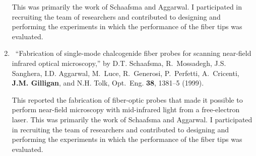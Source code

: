 \begin{enumerate}
\begin{credit}
	  This was primarily the work of Schaafsma and Aggarwal. I participated in recruiting the team of researchers and contributed to designing and performing the experiments in which the performance of the fiber tips was evaluated.
	  \end{credit}
%	
	\item
	\textdagger\ 
	\enquote{Fabrication of single-mode chalcogenide fiber probes for scanning
	  near-field infrared optical microscopy,}  by D.T. Schaafsma, R.~Mossadegh,
	  J.S. Sanghera, I.D. Aggarwal, M.~Luce, R.~Generosi, P.~Perfetti,
	  A.~Cricenti, \textbf{J.M. Gilligan}, and N.H. Tolk, Opt.\ Eng. \textbf{38}, 1381--5
	  (1999). 
	  \begin{credit}
	  This reported the fabrication of fiber-optic probes that made it possible to perform near-field microscopy with mid-infrared light from a free-electron laser.
	  This was primarily the work of Schaafsma and Aggarwal. I participated in recruiting the team of researchers and contributed to designing and performing the experiments in which the performance of the fiber tips was evaluated.
	  \end{credit}
	  

\end{enumerate}

